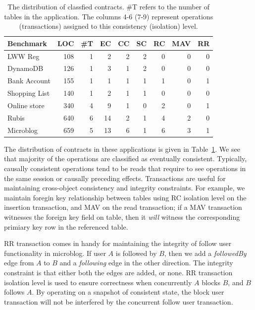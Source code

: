 \begin{table} \setlength{\tabcolsep}{4pt} {\sffamily \small \begin{center}
\begin{tabular} {|l|r|r|r|r|r|r|r|r|} \hline {\bf Benchmark} & {\bf LOC} & {\bf
\#T} & {\bf EC} & {\bf CC} & {\bf SC} & {\bf RC} & {\bf MAV} & {\bf RR} \\
\hline {LWW Reg} & 108 & 1 & 2 & 2 & 2 & 0 & 0 & 0 \\ {DynamoDB} & 126 & 1 & 3
& 1 & 2 & 0 & 0 & 0 \\ {Bank Account} & 155 & 1 & 1 & 1 & 1 & 1 & 0 & 1 \\
{Shopping List} & 140 & 1 & 2 & 1 & 1 & 0 & 0 & 0 \\ {Online store} & 340 & 4 &
9 & 1 & 0 & 2 & 0 & 1 \\ {Rubis} & 640 & 6 & 14 & 2 & 1 & 4 & 2 & 0 \\
{Microblog} & 659 & 5 & 13 & 6 & 1 & 6 & 3 & 1 \\ \hline \end{tabular}
\end{center} } \caption{The distribution of classfied contracts. \#T refers to
the number of tables in the application. The columns 4-6 (7-9) represent
operations (transactions) assigned to this consistency (isolation) level.}
\label{tab:ctrts} \end{table}

The distribution of contracts in these applications is given in
Table~\ref{tab:ctrts}. We see that majority of the operations are classified as
eventually consistent. Typically, causally consistent operations tend to be
reads that require to see operations in the same session or causally preceding
effects. Transactions are useful for maintaining cross-object consistency and
integrity constraints. For example, we maintain foregin key relationship
between tables using RC isolation level on the insertion transaction, and MAV
on the read transaction; if a MAV transaction witnesses the foreign key field
on table, then it \emph{will} witness the corresponding primiary key row in the
referenced table.

RR transaction comes in handy for maintaining the integrity of follow user
functionality in microblog. If user $A$ is followed by $B$, then we add a
\emph{followedBy} edge from $A$ to $B$ and a \emph{following} edge in the other
direction. The integrity constraint is that either both the edges are added, or
none. RR transaction isolation level is used to ensure correctness when
concurrently $A$ blocks $B$, and $B$ follows $A$. By operating on a snapshot of
consistent state, the block user transaction will not be interfered by the
concurrent follow user transaction.

